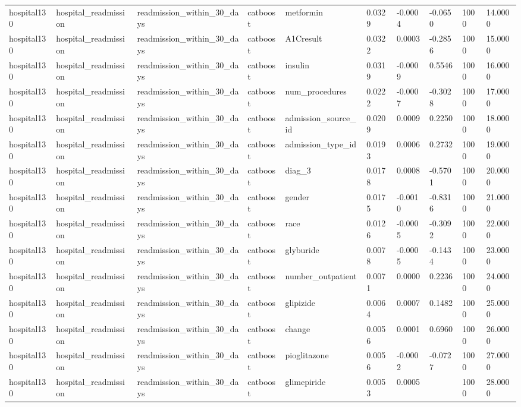 \begin{tabular}{llllllllll}
hospital130 & hospital\_readmission & readmission\_within\_30\_days & catboost & metformin & 0.0329 & -0.0004 & -0.0650 & 1000 & 14.0000 \\
hospital130 & hospital\_readmission & readmission\_within\_30\_days & catboost & A1Cresult & 0.0322 & 0.0003 & -0.2856 & 1000 & 15.0000 \\
hospital130 & hospital\_readmission & readmission\_within\_30\_days & catboost & insulin & 0.0319 & -0.0009 & 0.5546 & 1000 & 16.0000 \\
hospital130 & hospital\_readmission & readmission\_within\_30\_days & catboost & num\_procedures & 0.0222 & -0.0007 & -0.3028 & 1000 & 17.0000 \\
hospital130 & hospital\_readmission & readmission\_within\_30\_days & catboost & admission\_source\_id & 0.0209 & 0.0009 & 0.2250 & 1000 & 18.0000 \\
hospital130 & hospital\_readmission & readmission\_within\_30\_days & catboost & admission\_type\_id & 0.0193 & 0.0006 & 0.2732 & 1000 & 19.0000 \\
hospital130 & hospital\_readmission & readmission\_within\_30\_days & catboost & diag\_3 & 0.0178 & 0.0008 & -0.5701 & 1000 & 20.0000 \\
hospital130 & hospital\_readmission & readmission\_within\_30\_days & catboost & gender & 0.0175 & -0.0010 & -0.8316 & 1000 & 21.0000 \\
hospital130 & hospital\_readmission & readmission\_within\_30\_days & catboost & race & 0.0126 & -0.0005 & -0.3092 & 1000 & 22.0000 \\
hospital130 & hospital\_readmission & readmission\_within\_30\_days & catboost & glyburide & 0.0078 & -0.0005 & -0.1434 & 1000 & 23.0000 \\
hospital130 & hospital\_readmission & readmission\_within\_30\_days & catboost & number\_outpatient & 0.0071 & 0.0000 & 0.2236 & 1000 & 24.0000 \\
hospital130 & hospital\_readmission & readmission\_within\_30\_days & catboost & glipizide & 0.0064 & 0.0007 & 0.1482 & 1000 & 25.0000 \\
hospital130 & hospital\_readmission & readmission\_within\_30\_days & catboost & change & 0.0056 & 0.0001 & 0.6960 & 1000 & 26.0000 \\
hospital130 & hospital\_readmission & readmission\_within\_30\_days & catboost & pioglitazone & 0.0056 & -0.0002 & -0.0727 & 1000 & 27.0000 \\
hospital130 & hospital\_readmission & readmission\_within\_30\_days & catboost & glimepiride & 0.0053 & 0.0005 &  & 1000 & 28.0000 \\

\end{tabular}
